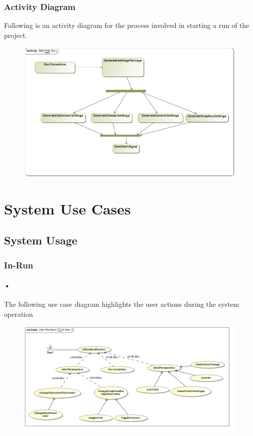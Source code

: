 \documentclass[11pt]{article}
\begin{document}
\subsubsection{Activity Diagram}
Following is an activity diagram for the process involved in starting a run of the project.
\begin{figure}[H]
	\includegraphics[scale=0.45]{GUI_Activity.jpg}
\end{figure}

\section{System Use Cases}
\subsection{System Usage}
\subsubsection{In-Run}
\paragraph{•}
The following use case diagram highlights the user actions during the system operation
\begin{figure}[H]
	\includegraphics[scale=0.45]{inUse.png}
\end{figure}
\end{document}
